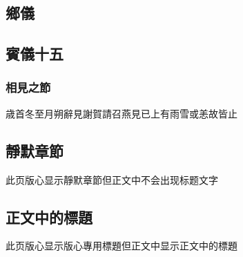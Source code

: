 \documentclass{ltc-guji}
\begin{document}
\clearpage

\begin{正文}

\chapter{鄉儀}

\section{賓儀十五}

\subsection{相見之節}

歳首冬至月朔辭見謝賀請召燕見已上有雨雪或恙故皆止

\end{正文}

\clearpage

\begin{正文}

\chapter*{靜默章節}

此页版心显示靜默章節但正文中不会出现标题文字

\end{正文}

\clearpage

\begin{正文}

\chapter[版心專用標題]{正文中的標題}

此页版心显示版心專用標題但正文中显示正文中的標題

\end{正文}
\end{document}
